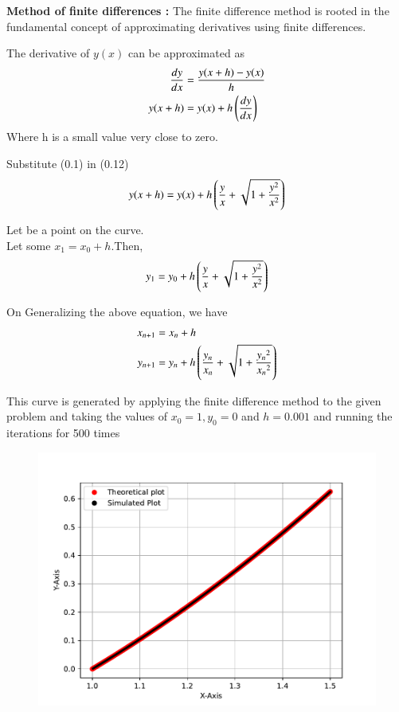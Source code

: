 \documentclass[journal]{IEEEtran}
\begin{document}
\textbf{Method of finite differences :}
The finite difference method is rooted in the fundamental concept of approximating derivatives using finite differences.

The derivative of $y(x)$ can be approximated as 
\begin{align}
    \frac{dy}{dx}&=\frac{y(x+h)-y(x)}{h}\\
    y(x+h)&=y(x)+h\left(\frac{dy}{dx}\right)
\end{align}
Where h is a small value very close to zero.

Substitute (0.1) in (0.12)
\begin{align}
    y(x+h)=y(x)+h \left(\frac{y}{x}+ \sqrt{1 + \frac{y^2}{x^2}}\right)
\end{align}

Let  be a point on the curve.\\
Let some $x_1=x_0 +h$.Then,
\begin{align}
    y_1 = y_0+h \left(\frac{y}{x}+ \sqrt{1 + \frac{y^2}{x^2}}\right)
\end{align}

On Generalizing the above equation, we have 
\begin{align}
    x_{n+1}&=x_{n} +h \\
    y_{n+1}&= y_{n}+h \left(\frac{y_n}{x_n}+ \sqrt{1 + \frac{{y_n}^2}{{x_n}^2}}\right)  
\end{align}

This curve is generated by applying the finite difference method to the given problem and taking the values of $x_0=1,y_0=0$ and $h=0.001$ and running the iterations for 500 times 
\begin{figure}[h]
   \centering
   \includegraphics[width=\columnwidth]{figs/fig.pdf}
\end{figure}
\end{document}
